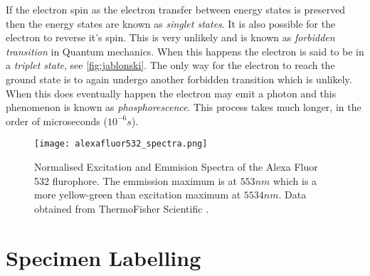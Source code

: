 

\begin{definition}
	If the electron spin as the electron transfer between energy states is preserved then the energy states are known as \textit{singlet states}. It is also possible for the electron to reverse it's spin. This is very unlikely and is known as \textit{forbidden transition} in Quantum mechanics. When this happens the electron is said to be in a \textit{triplet state}, see \autoref{fig:jablonski}. The only way for the electron to reach the ground state is to again undergo another forbidden transition which is unlikely. When this does eventually happen the electron may emit a photon and this phenomenon is known as \textit{phosphorescence}. This process takes much longer, in the order of microseconds ($10^{-6}s$).
\end{definition}


\begin{figure}[!t]
	\centering
	\texttt{[image: alexafluor532\_spectra.png]}
	\caption{Normalised Excitation and Emmision Spectra of the Alexa Fluor 532 flurophore.
	The emmission maximum is at $553nm$ which is a more yellow-green than excitation maximum at $5534nm$.
	Data obtained from ThermoFisher Scientific \citep{AlexaFluor532}.}
	\label{fig:excitationandemissionspectra}
\end{figure}


\section{Specimen Labelling}
\label{sec:SpecimenLabelling}

